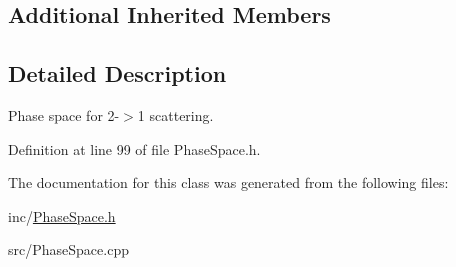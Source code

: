 \subsection*{Additional Inherited Members}


\subsection{Detailed Description}
Phase space for 2-\/$>$1 scattering. 

Definition at line 99 of file Phase\-Space.\-h.



The documentation for this class was generated from the following files\-:\begin{DoxyCompactItemize}
\item 
inc/\hyperlink{PhaseSpace_8h}{Phase\-Space.\-h}\item 
src/Phase\-Space.\-cpp\end{DoxyCompactItemize}
